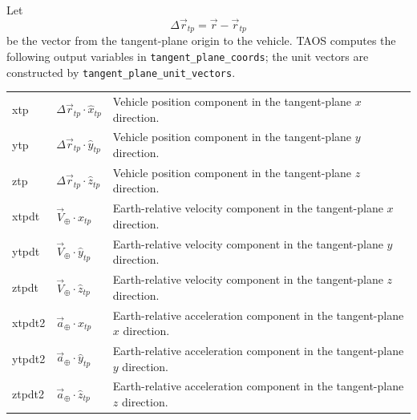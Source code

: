Let
\[
  \Delta\vec r_{tp}=\vec r-\vec r_{tp}
\]
be the vector from the tangent-plane origin to the vehicle. TAOS computes the
following output variables in \texttt{tangent\_plane\_coords}; the unit vectors are
constructed by \texttt{tangent\_plane\_unit\_vectors}.

\begin{longtable}{@{}>{\ttfamily}p{}p{}p{}@{}}
  xtp & $\Delta\vec r_{tp}\mathbin{\cdot}\hat x_{tp}$ &
    Vehicle position component in the tangent-plane $x$ direction.\\
  ytp & $\Delta\vec r_{tp}\mathbin{\cdot}\hat y_{tp}$ &
    Vehicle position component in the tangent-plane $y$ direction.\\
  ztp & $\Delta\vec r_{tp}\mathbin{\cdot}\hat z_{tp}$ &
    Vehicle position component in the tangent-plane $z$ direction.\\
  xtpdt & $\vec V_{\oplus}\mathbin{\cdot}\hat x_{tp}$ &
    Earth-relative velocity component in the tangent-plane $x$ direction.\\
  ytpdt & $\vec V_{\oplus}\mathbin{\cdot}\hat y_{tp}$ &
    Earth-relative velocity component in the tangent-plane $y$ direction.\\
  ztpdt & $\vec V_{\oplus}\mathbin{\cdot}\hat z_{tp}$ &
    Earth-relative velocity component in the tangent-plane $z$ direction.\\
  xtpdt2 & $\vec a_{\oplus}\mathbin{\cdot}\hat x_{tp}$ &
    Earth-relative acceleration component in the tangent-plane $x$ direction.\\
  ytpdt2 & $\vec a_{\oplus}\mathbin{\cdot}\hat y_{tp}$ &
    Earth-relative acceleration component in the tangent-plane $y$ direction.\\
  ztpdt2 & $\vec a_{\oplus}\mathbin{\cdot}\hat z_{tp}$ &
    Earth-relative acceleration component in the tangent-plane $z$ direction.\\
\end{longtable}
